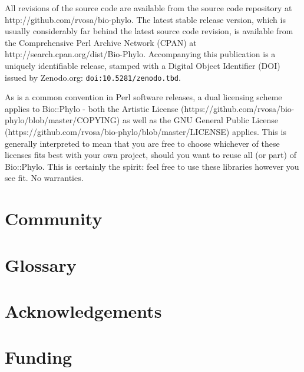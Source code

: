 \documentclass{bioinfo}
\begin{document}
All revisions of the source code are available from the source code repository at
http://github.com/rvosa/bio-phylo. The latest stable release version, which is usually 
considerably far behind the latest source code revision, is available from the 
Comprehensive Perl Archive Network (CPAN) at http://search.cpan.org/dist/Bio-Phylo. 
Accompanying this publication is a uniquely identifiable release, stamped with a Digital 
Object Identifier (DOI) issued by Zenodo.org: \texttt{doi:10.5281/zenodo.tbd}.

As is a common convention in Perl software releases, a dual licensing scheme applies to
Bio::Phylo - both the Artistic License 
(https://github.com/rvosa/bio-phylo/blob/master/COPYING) as well as the GNU General Public 
License (https://github.com/rvosa/bio-phylo/blob/master/LICENSE) applies. This is 
generally interpreted to mean that you are free to choose whichever of these licenses fits 
best with your own project, should you want to reuse all (or part) of Bio::Phylo. This is 
certainly the spirit: feel free to use these libraries however you see fit. No warranties.

\section{Community}

\section{Glossary}

\section*{Acknowledgements}

\section*{Funding}

%
%
%
%
%
%
%
%
%
\end{document}
